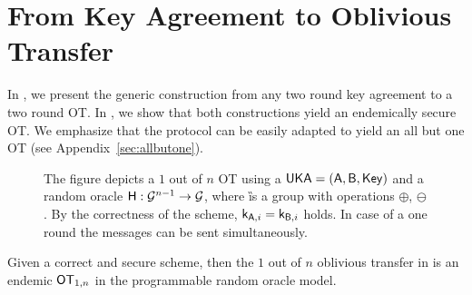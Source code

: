 \section{From Key Agreement to Oblivious Transfer}\label{sec:endemicOT}

In , we present the generic construction from any two round key agreement to a two round OT. In , we show that both constructions yield an endemically secure OT. We emphasize that the protocol can be easily adapted to yield an all but one OT (see Appendix~\ref{sec:allbutone}).



\begin{figure}
\centering
{}
\vspace{-0.3cm}
\caption{The figure depicts a $1$ out of $n$ OT using a $\mathsf{UKA}=(\mathsf{A},\mathsf{B},\mathsf{Key})$ and a random oracle $\mathsf{H}:\mathcal{G}^{n-1}\rightarrow\mathcal{G}$, where \G is a group with operations $\oplus$, $\ominus$. By the correctness of the \UKA scheme, $\mathsf{k}_{\mathsf{A},i}=\mathsf{k}_{\mathsf{B},i}$ holds. In case of a one round \UKA the messages can be sent simultaneously.}
\label{fig:KAtoOT}
\end{figure}


 
\begin{theorem}\label{thm:KAtoOT}

Given a correct and secure \UKA scheme, then the $1$ out of $n$ oblivious transfer in    is an endemic $\mathsf{OT}_{1,n}$ in the programmable random oracle model. 

\end{theorem}

